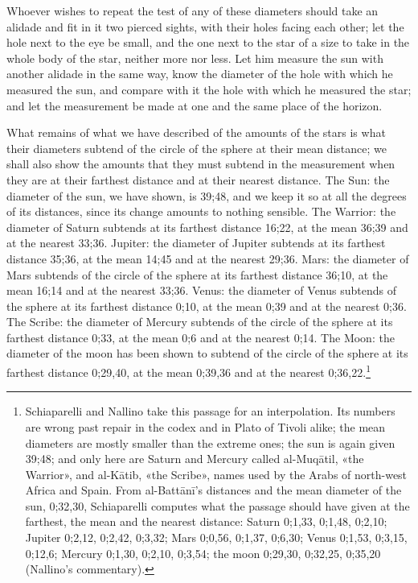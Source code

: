 \documentclass[11pt]{article}
\newcommand{\ArPage}[1]{\marginpar{\footnotesize\color{gray}Ar.\,p.\,#1}}
\begin{document}
\par \ArPage{186}Whoever wishes to repeat the test of any of these diameters should take an alidade and fit in it two pierced sights, with their holes facing each other; let the hole next to the eye be small, and the one next to the star of a size to take in the whole body of the star, neither more nor less. Let him measure the sun with another alidade in the same way, know the diameter of the hole with which he measured the sun, and compare with it the hole with which he measured the star; and let the measurement be made at one and the same place of the horizon.\par
\par What remains of what we have described of the amounts of the stars is what their diameters subtend of the circle of the sphere at their mean distance; we shall also show the amounts that they must subtend in the measurement when they are at their farthest distance and at their nearest distance. The Sun: the diameter of the sun, we have shown, is 39;48, and we keep it so at all the degrees of its distances, since its change amounts to nothing sensible. The Warrior: the diameter of Saturn subtends at its farthest distance 16;22, at the mean 36;39 and at the nearest 33;36. Jupiter: the diameter of Jupiter subtends at its farthest distance 35;36, at the mean 14;45 and at the nearest 29;36. Mars: the diameter of Mars subtends of the circle of the sphere at its farthest distance 36;10, at the mean 16;14 and at the nearest 33;36. Venus: the diameter of Venus subtends of the sphere at its farthest distance 0;10, at the mean 0;39 and at the nearest 0;36. The Scribe: the diameter of Mercury subtends of the circle of the sphere at its farthest distance 0;33, at the mean 0;6 and at the nearest 0;14. The Moon: the diameter of the moon has been shown to subtend of the circle of the sphere at its farthest distance 0;29,40, at the mean 0;39,36 and at the nearest 0;36,22.\footnote{Schiaparelli and Nallino take this passage for an interpolation. Its numbers are wrong past repair in the codex and in Plato of Tivoli alike; the mean diameters are mostly smaller than the extreme ones; the sun is again given 39;48; and only here are Saturn and Mercury called al-Muqātil, «the Warrior», and al-Kātib, «the Scribe», names used by the Arabs of north-west Africa and Spain. From al-Battānī's distances and the mean diameter of the sun, 0;32,30, Schiaparelli computes what the passage should have given at the farthest, the mean and the nearest distance: Saturn 0;1,33, 0;1,48, 0;2,10; Jupiter 0;2,12, 0;2,42, 0;3,32; Mars 0;0,56, 0;1,37, 0;6,30; Venus 0;1,53, 0;3,15, 0;12,6; Mercury 0;1,30, 0;2,10, 0;3,54; the moon 0;29,30, 0;32,25, 0;35,20 (Nallino's commentary).}\par
\end{document}
